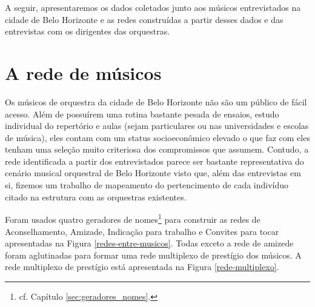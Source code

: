 \documentclass[a4paper, 12pt, openright, oneside, german, french, english, brazil]{abntex2}
\begin{document}
	A seguir, apresentaremos os dados coletados junto aos músicos entrevistados na cidade de Belo Horizonte e as redes construídas a partir desses dados e das entrevistas com os dirigentes das orquestras.
	
	
	
	\chapter{A rede de músicos}
	
	
	Os músicos de orquestra da cidade de Belo Horizonte não são um público de fácil acesso. Além de possuírem uma rotina bastante pesada de ensaios, estudo individual do repertório e aulas (sejam particulares ou nas universidades e escolas de música), eles contam com um status socioeconômico elevado o que faz com eles tenham uma seleção muito criteriosa dos compromissos que assumem. Contudo, a rede identificada a partir dos entrevistados parece ser bastante representativa do cenário musical orquestral de Belo Horizonte visto que, além das entrevistas em si, fizemos um trabalho de mapeamento do pertencimento de cada indivíduo citado na estrutura com as orquestras existentes.
	
	Foram usados quatro geradores de nomes\footnote{cf. Capítulo \ref{sec:geradores_nomes}.} para construir as redes de Aconselhamento, Amizade, Indicação para trabalho e Convites para tocar apresentadas na Figura \ref{redes-entre-musicos}. 	Todas exceto a rede de amizede foram aglutinadas para formar uma rede multiplexo de prestígio dos músicos. A rede multiplexo de prestígio está apresentada na Figura \ref{rede-multiplexo}.
	
\end{document}
